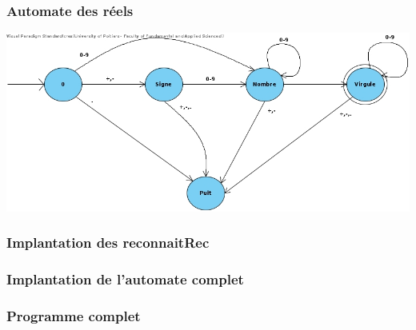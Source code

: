 \documentclass[./standalone.tex]{subfiles}
\begin{document}
\subsubsection{Automate des réels}
\medskip
\begin{center}
	\includegraphics[scale=0.5]{../VP/ex2_2.jpg}
\end{center}
\newpage

\subsubsection{Implantation des reconnaitRec}


\subsubsection{Implantation de l'automate complet}


\subsubsection{Programme complet}
\end{document}
